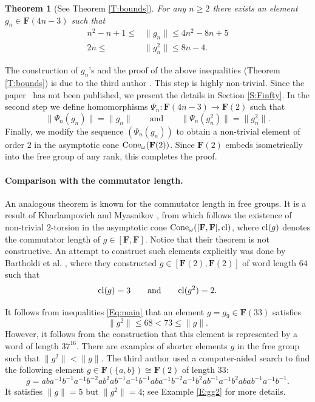 \documentclass[12pt,reqno,a4paper]{article}
\newtheorem{theorem}{Theorem}[section]
\theoremstyle{definition}
\theoremstyle{remark}
\numberwithin{equation}{section}
\numberwithin{figure}{section}
\newcommand{\B}[1]{{\mathbf #1}}
\begin{document}
\begin{theorem}[See Theorem \ref{T:bounds}]\label{thm:Nie intro}
For any $n\geq 2$ there exists an element %
$g_n \in \B F(4n-3)$ such that
\begin{equation}
\begin{aligned}
n^2-n+1 \leq &\|g_n\| \leq 4n^2-8n+5\\
2n \leq &\|g_n^2\| \leq 8n-4.
\end{aligned}
\label{Eq:main}
\end{equation}
\end{theorem}
The construction of $g_n$'s and the proof of the above inequalities (Theorem
\ref{T:bounds}) is due to
the third  author \cite[Theorem 5.1]{1412.0101}.
This step is highly non-trivial.
Since the paper~\cite{1412.0101} has not been published, we present the 
details in Section \ref{S:Finfty}.
In the second step we define homomorphisms  %
$\Psi_n\colon \B F({4n-3})\to \B F(2)$
such that
$$
\|\Psi_n(g_n)\| = \|g_n\| \qquad \text{and} \qquad \|\Psi_n(g_n^2)\| = \|g_n^2\|.
$$
Finally, we modify the sequence $(\Psi_n(g_n))$ to obtain a non-trivial element
of order $2$ in the asymptotic cone %
${\rm Cone}_{\omega}(\B F(2))$.
Since %
$\B F(2)$ 
embeds isometrically into the free group of any rank, this
completes the proof.

\paragraph{Comparison with the commutator length.}
An analogous theorem is known for the commutator length in free groups.
It is a result of Kharlampovich and Myasnikov \cite[Theorem 3 and 4]{zbMATH01744024}, 
from which follows the existence of non-trivial $2$-torsion in the asymptotic cone
${\rm Cone}_{\omega}([\B F,\B F],{\rm cl})$, where ${\rm cl}(g)$ denotes
the commutator length of $g\in [\B F,\B F]$. 
Notice that their theorem is not constructive.
An attempt to construct such elements explicitly was done by Bartholdi et al.
\cite[Theorem D]{zbMATH07861316}, where they constructed  
$g\in [\B F(2),\B F(2)]$ of word length $64$ such that
$$
{\rm cl}(g)=3\qquad\text{and}\qquad {\rm cl}(g^2)=2.
$$


It follows from inequalities \eqref{Eq:main} that an element $g=g_9\in \B F(33)$
satisfies 
$$
\|g^2\| \leq 68 < 73\leq \|g\|.
$$
However, it follows from the construction that this element is represented by a
word of length $37^{16}$. 
There are examples of shorter elements $g$ in the free group such that $\| g^2 \| < \|g \|$.
The third author used a computer-aided search \cite{cancellation-norm-search} to find the following element $g \in \B F(\{a,b\}) \cong \B F(2)$ of length $33$:
\[
g = aba^{-1}b^{-1}a^{-1}b^{-2}ab^{2}ab^{-1}a^{-1}b^{-1}aba^{-1}b^{-2}a^{-1}b^{2}ab^{-1}a^{-1}b^{2}abab^{-1}a^{-1}b^{-1}.
\]
It satisfies $\| g\|=5$ but $\| g^2\|=4$; see Example \ref{E:gg2} for more details.
\end{document}

